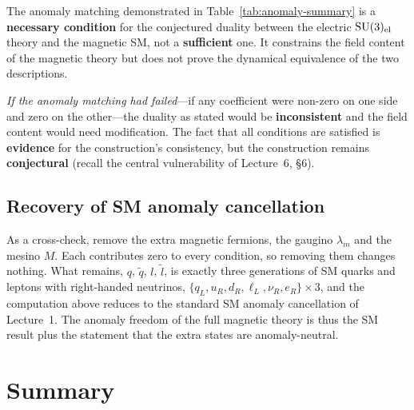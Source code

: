 \documentclass[11pt,a4paper]{article}
\begin{document}
\begin{warningbox}[title={Anomaly matching is necessary but not sufficient}]
  The anomaly matching demonstrated in Table~\ref{tab:anomaly-summary}
  is a \textbf{necessary condition} for the conjectured duality between
  the electric $\mathrm{SU}(3)_{\mathrm{el}}$ theory and the magnetic SM, not a
  \textbf{sufficient} one.  It constrains the field content of the
  magnetic theory but does not prove the dynamical equivalence of the
  two descriptions.

  \medskip

  \emph{If the anomaly matching had failed}---if any coefficient were
  non-zero on one side and zero on the other---the duality as stated
  would be \textbf{inconsistent} and the field content would need
  modification.  The fact that all conditions are satisfied is
  \textbf{evidence} for the construction's consistency, but the
  construction remains \textbf{conjectural} (recall the central
  vulnerability of Lecture~6, \S6).
\end{warningbox}

\subsection{Recovery of SM anomaly cancellation}

As a cross-check, remove the extra magnetic fermions, the gaugino
$\lambda_m$ and the mesino $M$.  Each contributes zero to every
condition, so removing them changes nothing.  What remains, $q$,
$\widetilde{q}$, $l$, $\widetilde{l}$, is exactly three generations of
SM quarks and leptons with right-handed neutrinos,
$\{q_L, u_R, d_R, \ell_L, \nu_R, e_R\} \times 3$, and the computation
above reduces to the standard SM anomaly cancellation of Lecture~1.  The
anomaly freedom of the full magnetic theory is thus the SM result plus
the statement that the extra states are anomaly-neutral.


\section{Summary}
\label{sec:summary-lec7}
\end{document}
